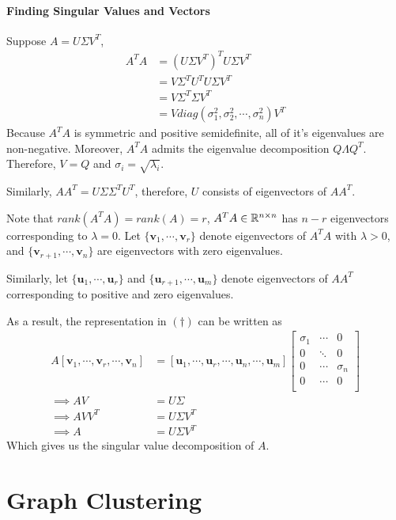 \documentclass[11pt]{article}
\begin{document}
	\paragraph{Finding Singular Values and Vectors}
	Suppose $A = U \Sigma V^T$,
	\begin{align}
		A^T A &= (U \Sigma V^T)^T U \Sigma V^T \\
		&= V \Sigma^T U^T U \Sigma V^T \\
		&= V \Sigma^T \Sigma V^T \\
		&= V diag(\sigma_1^2, \sigma_2^2, \cdots, \sigma_n^2) V^T
	\end{align}
	Because $A^T A$ is symmetric and positive semidefinite, all of it's eigenvalues are non-negative. Moreover, $A^TA$ admits the eigenvalue decomposition $Q \Lambda Q^T$. Therefore, $V = Q$ and $\sigma_i = \sqrt{\lambda_i}$.
	
	Similarly, $A A^T = U \Sigma \Sigma^T U^T$, therefore, $U$ consists of eigenvectors of $A A^T$.
	
	Note that $rank(A^TA) = rank(A) = r$, $A^T A \in \mathbb{R}^{n \times n}$ has $n - r$ eigenvectors corresponding to $\lambda = 0$.
	Let $\{\mathbf{v}_1, \cdots, \mathbf{v}_r\}$ denote eigenvectors of $A^TA$ with $\lambda > 0$, and $\{\mathbf{v}_{r+1}, \cdots, \mathbf{v}_{n}\}$ are eigenvectors with zero eigenvalues.
	
	Similarly, let $\{\mathbf{u}_1, \cdots, \mathbf{u}_r\}$ and $\{\mathbf{u}_{r+1}, \cdots, \mathbf{u}_m\}$ denote eigenvectors of $AA^T$ corresponding to positive and zero eigenvalues.

	As a result, the representation in $(\dagger)$ can be written as 
	\begin{align}
		A [\mathbf{v}_1, \cdots, \mathbf{v}_r, \cdots, \mathbf{v}_n] &= [\mathbf{u}_1, \cdots, \mathbf{u}_r, \cdots, \mathbf{u}_n, \cdots, \mathbf{u}_m] \begin{bmatrix}
			\sigma_1 & \cdots & 0 \\
			0 & \ddots & 0 \\
			0 & \cdots & \sigma_n \\
			0 & \cdots & 0 \\
		\end{bmatrix} \\
		\implies A V &= U \Sigma \\
		\implies A V V^T &= U \Sigma V^T \\
		\implies A &= U \Sigma V^T
	\end{align}
	Which gives us the singular value decomposition of $A$.
	\section{Graph Clustering}
\end{document}
